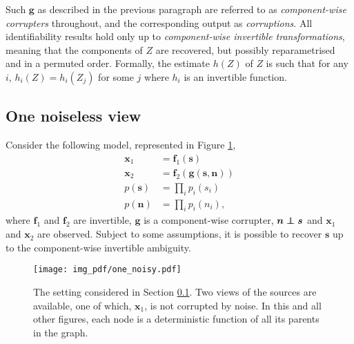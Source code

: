 Such $\bm{g}$ as described in the previous paragraph are referred to as \emph{component-wise corrupters} throughout, and the corresponding output as \emph{corruptions}. 
All identifiability results hold only up to \emph{component-wise invertible transformations}, meaning that the components of $Z$ are recovered, but possibly reparametrised and in a permuted order. 
Formally, the estimate $h(Z)$ of $Z$ is such that for any $i$, $h_i(Z)=h_i(Z_j)$ for some $j$ where $h_i$ is an invertible function. 





\subsection{One noiseless view}
\label{sec:onenoisless}
Consider the following model, represented in Figure \ref{fig:generalized_hsr_basic},
\begin{align}
\bm{x}_{1}&=\bm{f}_{1}(\bm{s}) \label{eq:sem2_1}\\
\bm{x}_{2}&=\bm{f}_{2}(\bm{g}(\bm{s}, \bm{n})) \label{eq:sem2_2} \\
p(\bm{s}) &= \prod_{i} p_i(s_i) \nonumber \\
p(\bm{n}) &= \prod_{i} p_i(n_i), \label{eq:indep}
\end{align}
where $\bm{f}_1$ and $\bm{f}_2$ are invertible, $\bm{g}$ is a component-wise corrupter, $\bm{n} \independent \bm{s}$ and $\bm{x}_1$ and $\bm{x}_2$ are observed.
Subject to some assumptions, it is possible to recover $\bm{s}$ up to the
component-wise invertible ambiguity.

\begin{figure}[t!]
	\centering
	\texttt{[image: img\_pdf/one\_noisy.pdf]}
	\caption{The setting considered in Section \ref{sec:onenoisless}. Two views of the sources are available, one of which, $\bm{x}_1$, is not corrupted by noise. In this and all other figures, each node is a deterministic function of all its parents in the graph.
	}
	\label{fig:generalized_hsr_basic}
\end{figure}

\medskip

